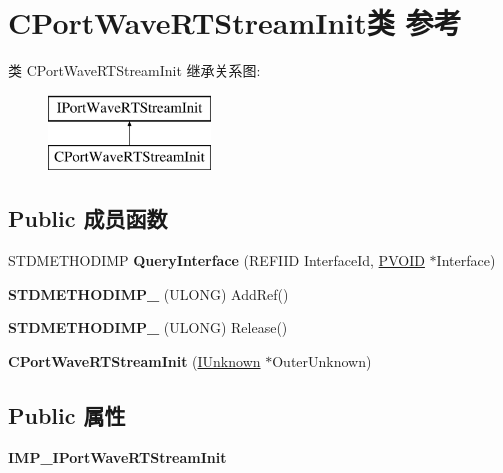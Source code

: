 \hypertarget{class_c_port_wave_r_t_stream_init}{}\section{C\+Port\+Wave\+R\+T\+Stream\+Init类 参考}
\label{class_c_port_wave_r_t_stream_init}
类 C\+Port\+Wave\+R\+T\+Stream\+Init 继承关系图\+:\begin{figure}[H]
\begin{center}
\leavevmode
\includegraphics[height=2.000000cm]{class_c_port_wave_r_t_stream_init}
\end{center}
\end{figure}
\subsection*{Public 成员函数}
\begin{DoxyCompactItemize}
\item 
\mbox{\label{class_c_port_wave_r_t_stream_init_ac5f19f422d4ec97bc15ad61714ed50fb}} 
S\+T\+D\+M\+E\+T\+H\+O\+D\+I\+MP {\bfseries Query\+Interface} (R\+E\+F\+I\+ID Interface\+Id, \hyperlink{interfacevoid}{P\+V\+O\+ID} $\ast$Interface)
\item 
\mbox{\label{class_c_port_wave_r_t_stream_init_a032e1f5415957796e09acfbff7740ff7}} 
{\bfseries S\+T\+D\+M\+E\+T\+H\+O\+D\+I\+M\+P\+\_\+} (U\+L\+O\+NG) Add\+Ref()
\item 
\mbox{\label{class_c_port_wave_r_t_stream_init_ab2057613ce80197e7bde21761091346f}} 
{\bfseries S\+T\+D\+M\+E\+T\+H\+O\+D\+I\+M\+P\+\_\+} (U\+L\+O\+NG) Release()
\item 
\mbox{\label{class_c_port_wave_r_t_stream_init_a7cb8612925abf437c3027dd6bc08c585}} 
{\bfseries C\+Port\+Wave\+R\+T\+Stream\+Init} (\hyperlink{interface_i_unknown}{I\+Unknown} $\ast$Outer\+Unknown)
\end{DoxyCompactItemize}
\subsection*{Public 属性}
\begin{DoxyCompactItemize}
\item 
\mbox{\label{class_c_port_wave_r_t_stream_init_ae03d6ac857baf8bc12763149702ad715}} 
{\bfseries I\+M\+P\+\_\+\+I\+Port\+Wave\+R\+T\+Stream\+Init}
\end{DoxyCompactItemize}
